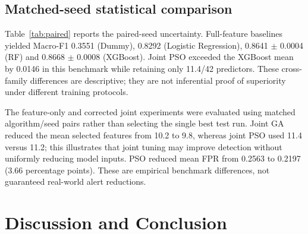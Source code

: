 \documentclass[10pt,a4paper,twocolumn]{extarticle}
\begin{document}
\subsection{Matched-seed statistical comparison}
\begin{table}[ht]\centering\scriptsize
{}
\caption{Within-algorithm paired differences in held-out Macro-F1, calculated as joint minus feature-only over five matched seeds. Reported quantities are mean paired improvement, the two-sided 95\% paired $t$ interval, and unadjusted paired $t$-test and exact two-sided Wilcoxon signed-rank $p$-values. With only five seeds and four comparisons, these are exploratory rather than confirmatory significance tests.}\label{tab:paired}\end{table}
Table~\ref{tab:paired} reports the paired-seed uncertainty. Full-feature baselines yielded Macro-F1 0.3551 (Dummy), 0.8292 (Logistic Regression), 0.8641 $\pm$ 0.0004 (RF) and 0.8668 $\pm$ 0.0008 (XGBoost). Joint PSO exceeded the XGBoost mean by 0.0146 in this benchmark while retaining only 11.4/42 predictors. These cross-family differences are descriptive; they are not inferential proof of superiority under different training protocols.

The feature-only and corrected joint experiments were evaluated using matched algorithm/seed pairs rather than selecting the single best test run. Joint GA reduced the mean selected features from 10.2 to 9.8, whereas joint PSO used 11.4 versus 11.2; this illustrates that joint tuning may improve detection without uniformly reducing model inputs. PSO reduced mean FPR from 0.2563 to 0.2197 (3.66 percentage points). These are empirical benchmark differences, not guaranteed real-world alert reductions.

\section{Discussion and Conclusion}
\end{document}
